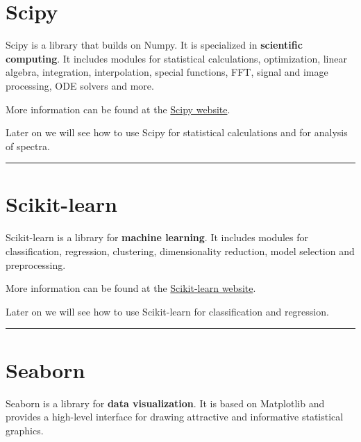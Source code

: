 \documentclass[
  letterpaper,
  DIV=11,
  numbers=noendperiod]{scrreprt}
\begin{document}

\section*{Scipy}\label{scipy}


Scipy is a library that builds on Numpy. It is specialized in
\textbf{scientific computing}. It includes modules for statistical
calculations, optimization, linear algebra, integration, interpolation,
special functions, FFT, signal and image processing, ODE solvers and
more.

More information can be found at the \href{https://www.scipy.org/}{Scipy
website}.

Later on we will see how to use Scipy for statistical calculations and
for analysis of spectra.

\begin{center}\rule{0.5\linewidth}{0.5pt}\end{center}

\section*{Scikit-learn}\label{scikit-learn}


Scikit-learn is a library for \textbf{machine learning}. It includes
modules for classification, regression, clustering, dimensionality
reduction, model selection and preprocessing.

More information can be found at the
\href{https://scikit-learn.org/stable/}{Scikit-learn website}.

Later on we will see how to use Scikit-learn for classification and
regression.

\begin{center}\rule{0.5\linewidth}{0.5pt}\end{center}

\section*{Seaborn}\label{seaborn}


Seaborn is a library for \textbf{data visualization}. It is based on
Matplotlib and provides a high-level interface for drawing attractive
and informative statistical graphics.
\end{document}

